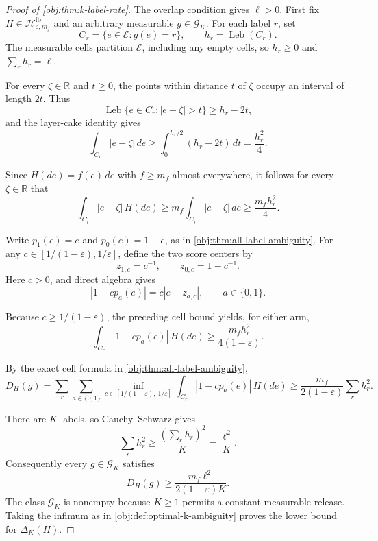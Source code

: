 \begin{proof}[Proof of \cref{obj:thm:k-label-rate}]
The overlap condition gives \(\ell>0\). First fix \(H\in\mathcal H^{\mathrm{lb}}_{\varepsilon,m_f}\) and an arbitrary measurable \(g\in\mathcal G_K\). For each label \(r\), set
\[
C_r=\{e\in\mathcal E:g(e)=r\},
\qquad h_r=\operatorname{Leb}(C_r).
\]
The measurable cells partition \(\mathcal E\), including any empty cells, so \(h_r\geq0\) and \(\sum_r h_r=\ell\). %

For every \(\zeta\in\mathbb R\) and \(t\geq0\), the points within distance \(t\) of \(\zeta\) occupy an interval of length \(2t\). Thus
\[
\operatorname{Leb}\{e\in C_r:|e-\zeta|>t\}\geq h_r-2t,
\]
and the layer-cake identity gives
\[
\int_{C_r}|e-\zeta|\,de
\geq\int_0^{h_r/2}(h_r-2t)\,dt
=\frac{h_r^2}{4}.
\] %

Since \(H(de)=f(e)\,de\) with \(f\geq m_f\) almost everywhere, it follows for every \(\zeta\in\mathbb R\) that
\[
\int_{C_r}|e-\zeta|\,H(de)
\geq m_f\int_{C_r}|e-\zeta|\,de
\geq \frac{m_fh_r^2}{4}.
\] %

Write \(p_1(e)=e\) and \(p_0(e)=1-e\), as in \cref{obj:thm:all-label-ambiguity}. For any \(c\in[1/(1-\varepsilon),1/\varepsilon]\), define the two score centers by
\[
z_{1,c}=c^{-1},\qquad z_{0,c}=1-c^{-1}.
\]
Here \(c>0\), and direct algebra gives
\[
|1-cp_a(e)|=c|e-z_{a,c}|,
\qquad a\in\{0,1\}.
\] %

Because \(c\geq1/(1-\varepsilon)\), the preceding cell bound yields, for either arm,
\[
\int_{C_r}|1-cp_a(e)|\,H(de)
\geq \frac{m_fh_r^2}{4(1-\varepsilon)}.
\] %

By the exact cell formula in \cref{obj:thm:all-label-ambiguity},
\[
D_H(g)
=\sum_r\sum_{a\in\{0,1\}}
\inf_{c\in[1/(1-\varepsilon),\,1/\varepsilon]}
\int_{C_r}|1-cp_a(e)|\,H(de)
\geq \frac{m_f}{2(1-\varepsilon)}\sum_r h_r^2.
\] %

There are \(K\) labels, so Cauchy–Schwarz gives
\[
\sum_r h_r^2
\geq \frac{(\sum_r h_r)^2}{K}
=\frac{\ell^2}{K}.
\] %
Consequently every \(g\in\mathcal G_K\) satisfies
\[
D_H(g)\geq\frac{m_f\ell^2}{2(1-\varepsilon)K}.
\] %
The class \(\mathcal G_K\) is nonempty because \(K\geq1\) permits a constant measurable release. Taking the infimum as in \cref{obj:def:optimal-k-ambiguity} proves the lower bound for \(\Delta_K(H)\). %


\end{proof}
